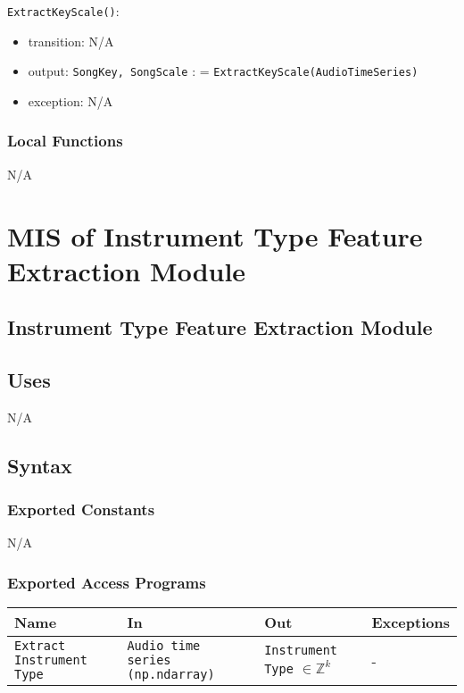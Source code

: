 \documentclass[12pt, titlepage]{article}
\begin{document}
\noindent \texttt{ExtractKeyScale()}:
\begin{itemize}
\item transition: N/A
\item output: \texttt{Song\textunderscore Key, Song\textunderscore Scale} : = \texttt{ExtractKeyScale(Audio\textunderscore Time\textunderscore Series)}
\item exception: N/A
\end{itemize}

\subsubsection{Local Functions}
N/A


\section{MIS of Instrument Type Feature Extraction Module} 

\subsection{Instrument Type Feature Extraction Module}

\subsection{Uses}
N/A

\subsection{Syntax}

\subsubsection{Exported Constants}
N/A

\subsubsection{Exported Access Programs}

\begin{center}
\begin{tabular}{p{2cm} p{4cm} p{4cm} p{2cm}}
\hline
\textbf{Name} & \textbf{In} & \textbf{Out} & \textbf{Exceptions}\\
\hline%
\texttt{Extract Instrument Type} &\texttt{Audio time series (np.ndarray)} &\texttt{Instrument Type} $\in \mathbb{Z}^k$ &-\\
\hline
\end{tabular}
\end{center}
\end{document}
